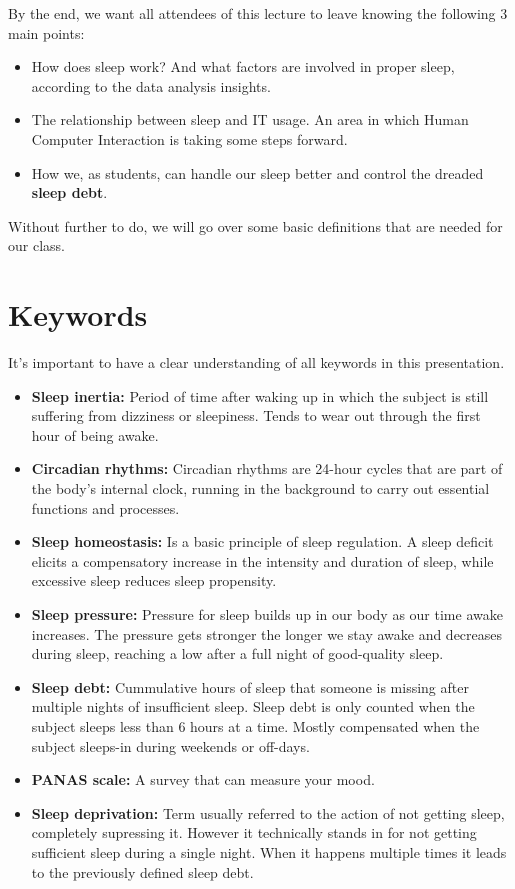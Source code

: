 \documentclass[]{IEEEtran}
\begin{document}
By the end, we want all attendees of this lecture to leave knowing the following 3 main points:

\begin{itemize}
    \item How does sleep work? And what factors are involved in proper sleep, according to the data analysis insights.
    \item The relationship between sleep and IT usage. An area in which Human Computer Interaction is taking some steps forward.
    \item How we, as students, can handle our sleep better and control the dreaded \textbf{sleep debt}.
\end{itemize}

Without further to do, we will go over some basic definitions that are needed for our class.

\section{Keywords}
It's important to have a clear understanding of all keywords in this presentation.

\begin{itemize}
    \item \textbf{Sleep inertia:} Period of time after waking up in which the subject is still suffering from dizziness or sleepiness. Tends to wear out through the first hour of being awake.
    \item \textbf{Circadian rhythms:} Circadian rhythms are 24-hour cycles that are part of the body’s internal clock, running in the background to carry out essential functions and processes.  
    \item \textbf{Sleep homeostasis:} Is a basic principle of sleep regulation. A sleep deficit elicits a compensatory increase in the intensity and duration of sleep, while excessive sleep reduces sleep propensity.
    \item \textbf{Sleep pressure:} Pressure for sleep builds up in our body as our time awake increases. The pressure gets stronger the longer we stay awake and decreases during sleep, reaching a low after a full night of good-quality sleep.
    \item \textbf{Sleep debt:} Cummulative hours of sleep that someone is missing after multiple nights of insufficient sleep. Sleep debt is only counted when the subject sleeps less than 6 hours at a time. Mostly compensated when the subject sleeps-in during weekends or off-days. 
    \item \textbf{PANAS scale:}  A survey that can measure your mood.
    \item \textbf{Sleep deprivation:} Term usually referred to the action of not getting sleep, completely supressing it. However it technically stands in for not getting sufficient sleep during a single night. When it happens multiple times it leads to the previously defined sleep debt.
\end{itemize}
\end{document}
